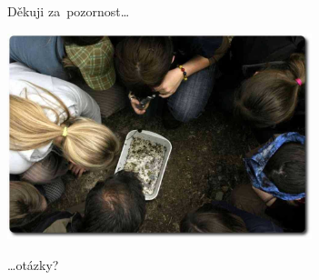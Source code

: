 \documentclass[compress, xelatex, 11pt, xcolor=dvipsnames, print, aspectratio=169,
	hyperref={
		bookmarks=true,
		unicode=true,
		colorlinks=true,
		pdftitle={Skautska vychovna metoda},
		plainpages=false,
		pdfauthor={Vojtech Zeisek},
		pdfsubject={Skautska vychovna metoda a jeji vyvoj za posledni stoleti a desetileti},
		pdfcreator={XeLaTeX},
		pdfkeywords={Junak, Pedagogika, Skaut, Skauting, Vychovna metoda},
		linkcolor=Red, %
		anchorcolor=ForestGreen, %
		citecolor=ForestGreen, %
		filecolor=ForestGreen, %
		menucolor=ForestGreen, %
		urlcolor=Sepia, %
		pdftex},
	url={hyphens, lowtilde} %
	]{beamer}
\begin{document}
\begin{frame}{Děkuji za~pozornost\ldots}
	\begin{center}
		\includegraphics[height=6cm]{zaver.jpg}
	\end{center}
	\begin{flushright}
		\begin{large}
			\ldots otázky?
		\end{large}
	\end{flushright}
\end{frame}
\end{document}
